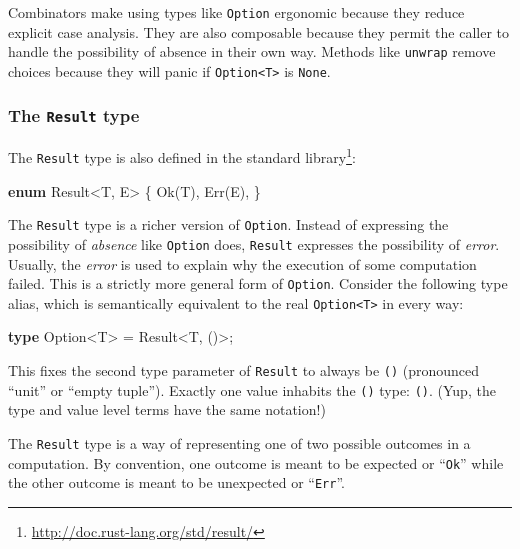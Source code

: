 \documentclass[a4paper,]{book}
\newenvironment{Shaded}{\begin{snugshade}}{\end{snugshade}}
\newcommand{\KeywordTok}[1]{\textcolor[rgb]{0.13,0.29,0.53}{\textbf{{#1}}}}
\newcommand{\DataTypeTok}[1]{\textcolor[rgb]{0.13,0.29,0.53}{{#1}}}
\newcommand{\ConstantTok}[1]{\textcolor[rgb]{0.00,0.00,0.00}{{#1}}}
\newcommand{\NormalTok}[1]{{#1}}
\renewcommand{\href}[2]{#2\footnote{\url{#1}}}
\begin{document}
Combinators make using types like \texttt{Option} ergonomic because they
reduce explicit case analysis. They are also composable because they
permit the caller to handle the possibility of absence in their own way.
Methods like \texttt{unwrap} remove choices because they will panic if
\texttt{Option\textless{}T\textgreater{}} is \texttt{None}.

\hypertarget{the-result-type}{\subsubsection{\texorpdfstring{The
\texttt{Result} type}{The Result type}}\label{the-result-type}}

The \texttt{Result} type is also
\href{http://doc.rust-lang.org/std/result/}{defined in the standard
library}:

\protect\hypertarget{code-result-def}{}{}

\begin{Shaded}
\begin{Highlighting}[]
\KeywordTok{enum} \DataTypeTok{Result}\NormalTok{<T, E> \{}
    \ConstantTok{Ok}\NormalTok{(T),}
    \ConstantTok{Err}\NormalTok{(E),}
\NormalTok{\}}
\end{Highlighting}
\end{Shaded}

The \texttt{Result} type is a richer version of \texttt{Option}. Instead
of expressing the possibility of \emph{absence} like \texttt{Option}
does, \texttt{Result} expresses the possibility of \emph{error}.
Usually, the \emph{error} is used to explain why the execution of some
computation failed. This is a strictly more general form of
\texttt{Option}. Consider the following type alias, which is
semantically equivalent to the real
\texttt{Option\textless{}T\textgreater{}} in every way:

\begin{Shaded}
\begin{Highlighting}[]
\KeywordTok{type} \NormalTok{Option<T> = }\DataTypeTok{Result}\NormalTok{<T, ()>;}
\end{Highlighting}
\end{Shaded}

This fixes the second type parameter of \texttt{Result} to always be
\texttt{()} (pronounced ``unit'' or ``empty tuple''). Exactly one value
inhabits the \texttt{()} type: \texttt{()}. (Yup, the type and value
level terms have the same notation!)

The \texttt{Result} type is a way of representing one of two possible
outcomes in a computation. By convention, one outcome is meant to be
expected or ``\texttt{Ok}'' while the other outcome is meant to be
unexpected or ``\texttt{Err}''.
\end{document}

